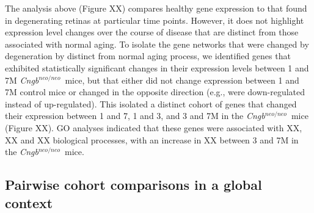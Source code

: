 \documentclass[11pt, a4paper]{article}
\newcommand{\cngb}{\textit{Cngb$^{neo/neo}$}~}
\newcommand{\cngbwt}{\textit{Cngb1$^{+/neo}$}~}
\begin{document}
The analysis above (Figure XX) compares healthy gene expression to that found in degenerating retinas at particular time points. However, it does not highlight expression level changes over the course of disease that are distinct from those associated with normal aging. To isolate the gene networks that were changed by degeneration by distinct from normal aging process, we identified genes that exhibited statistically significant changes in their expression levels between 1 and 7M \cngb mice, but that either did not change expression between 1 and 7M control mice or changed in the opposite direction (e.g., were down-regulated instead of up-regulated). This isolated a distinct cohort of genes that changed their expression between 1 and 7, 1 and 3, and 3 and 7M in the \cngb mice (Figure XX). GO analyses indicated that these genes were associated with XX, XX and XX biological processes, with an increase in XX between 3 and 7M in the \cngb mice.








\subsection*{Pairwise cohort comparisons in a global context}
\end{document}
